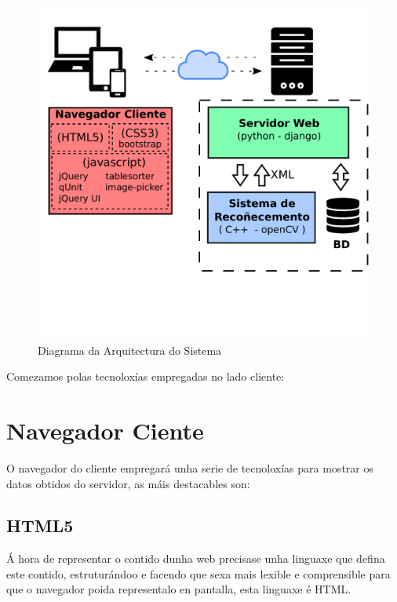     \begin{figure}[htp]
    \begin{center}
        \includegraphics[scale=0.6]{figures/ArqSistemaCustom.pdf}
        \caption{Diagrama da Arquitectura do Sistema}
    \label{fig:ArqSistemaCustom}
    \end{center}
    \end{figure}
    
    Comezamos polas tecnoloxías empregadas no lado cliente:
    \section{Navegador Ciente}
    
    O navegador do cliente empregará unha serie de tecnoloxías para mostrar os datos obtidos do 
    servidor, as máis destacables son:
    
    \subsection{HTML5}
        Á hora de representar o contido dunha web precisase unha linguaxe que defina este contido,
        estruturándoo e facendo que sexa mais lexible e comprensible para que o navegador poida 
        representalo en pantalla, esta linguaxe é HTML.
        
